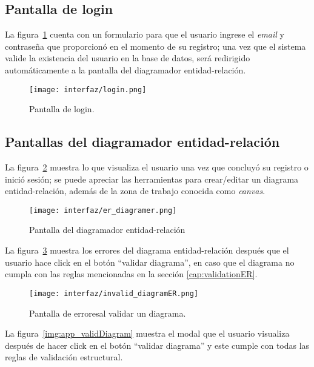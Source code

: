\subsection*{Pantalla de login}

La figura~\ref{img:app_login} cuenta con un formulario para que el usuario ingrese el \textit{email} y contraseña que proporcionó en el momento de su registro; una vez que el sistema valide la existencia del usuario en la base de datos, será redirigido automáticamente a la pantalla del diagramador entidad-relación.

\begin{figure}[H]
    \centering
    \texttt{[image: interfaz/login.png]}
    \caption{Pantalla de login.}
    \label{img:app_login}
\end{figure}


\subsection*{Pantallas del diagramador entidad-relación}

La figura~\ref{img:app_diagrammerER} muestra lo que visualiza el usuario una vez que concluyó su registro o inició sesión; se puede apreciar las herramientas para crear/editar un diagrama entidad-relación, además de la zona de trabajo conocida como \textit{canvas}.

\begin{figure}[H]
    \centering
    \texttt{[image: interfaz/er\_diagramer.png]}
    \caption{Pantalla del diagramador entidad-relación}
    \label{img:app_diagrammerER}
\end{figure}


La figura~\ref{img:app_errorDiagram} muestra los errores del diagrama entidad-relación después que el usuario hace click en el  botón ``validar diagrama'', en caso que el diagrama no cumpla con las reglas mencionadas en la sección \ref{cap:validationER}.

\begin{figure}[H]
    \centering
    \texttt{[image: interfaz/invalid\_diagramER.png]}
    \caption{Pantalla de erroresal validar un diagrama.}
    \label{img:app_errorDiagram}
\end{figure}

La figura~\ref{img:app_validDiagram} muestra el modal que el usuario visualiza después de hacer click en el botón ``validar diagrama'' y este cumple con todas las reglas de validación estructural.

